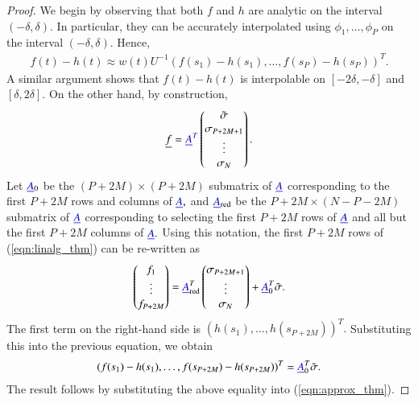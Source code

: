 \begin{proof}
We begin by observing that both $f$ and $h$ are analytic on the interval $(-\delta,\delta).$ In particular, they can be accurately interpolated using $\phi_1,\dots,\phi_P$ on the interval $(-\delta,\delta).$ Hence,
\begin{align}\label{eqn:approx_thm}
f(t)-h(t) \approx w(t) U^{-1} (f(s_1)-h(s_1),\dots,f(s_P)-h(s_P))^T.
\end{align}
A similar argument shows that $f(t)-h(t)$ is interpolable on $[-2\delta,-\delta]$ and $[\delta,2\delta].$
On the other hand, by construction,
\begin{align}\label{eqn:linalg_thm}
\underline{f} = {\color{blue} \underline{A}^T} \begin{pmatrix}\tilde{\sigma}\\ \sigma_{P+{2M+1}}\\ \vdots\\ \sigma_N\end{pmatrix}.
\end{align}
Let ${\color{blue} \underline{A}}_0$ be the $(P+2M)\times (P+2M)$ submatrix of ${\color{blue} \underline{A}}$ corresponding to the first $P+2M$ rows and columns of ${\color{blue} \underline{A}},$ and ${\color{blue} \underline{A}}_{\rm red}$ be the $P+2M \times (N-P-2M)$  submatrix of ${\color{blue} \underline{A}}$ corresponding to selecting the first $P+2M$ rows of ${\color{blue} \underline{A}}$ and all but the first $P+2M$ columns of ${\color{blue} \underline{A}}.$ Using this notation, the first $P+2M$ rows of (\ref{eqn:linalg_thm}) can be re-written as
\begin{align}
\begin{pmatrix}f_1\\\vdots \\ f_{P+2M}\end{pmatrix}  = {\color{blue} \underline{A}}_{\rm red}^T \begin{pmatrix} \sigma_{P+2M+1}\\ \vdots\\ \sigma_N\end{pmatrix} + {\color{blue} \underline{A}}_0^T \tilde{\sigma}.
\end{align}
The first term on the right-hand side is $(h(s_1),\dots,h(s_{P+2M}))^T.$ Substituting this into the previous equation, we obtain
\begin{align}
(f(s_1)-h(s_1),\dots,f(s_{P+2M})-h(s_{P+2M}))^T = {\color{blue} \underline{A}}_0^T \tilde{\sigma}.
\end{align}
The result follows by substituting the above equality into (\ref{eqn:approx_thm}).
\end{proof}

